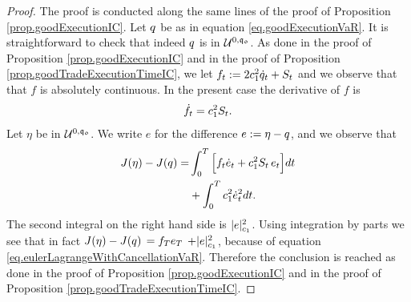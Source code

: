 \documentclass[10pt,a4paper]{article}
\begin{document}
\begin{proof}
	The proof is conducted along the same lines of the proof of Proposition \ref{prop.goodExecutionIC}.
	Let $q$ be as in equation \eqref{eq.goodExecutionVaR}. It is straightforward to check that indeed $q$ is in $\mathcal{U}^{0,\mathfrak{q_0}}$. 
	As done in the proof of Proposition \ref{prop.goodExecutionIC} and in the proof of Proposition \ref{prop.goodTradeExecutionTimeIC}, we let 
	 $f_t:= 2c_{1}^{2} \dot{q}_{t} + S_t$ and we observe that   that $f$ is absolutely continuous. In the present case the derivative of $f$ is  
	\begin{equation}\label{eq.eulerLagrangeWithCancellationVaR}
	\dot{f}_t =c_{1}^{2} S_t .
	\end{equation}
	Let $\eta$ be in $\mathcal{U}^{0,\mathfrak{q_0}}$. We write $e$ for the difference $e:=\eta-q$, and we observe that
	\begin{equation*}
	\begin{split}
	J(\eta) - J(q) = &
	\int_{0}^{T} \Big[ f_t \dot{e}_t + c_{1}^{2}S_t \, e_t\Big]dt\\
	&+\int_{0}^{T}c_{1}^{2} \dot{e}_t^{2} dt.
	\end{split}
	\end{equation*}
	The second integral on the right hand side is $ \lvert e \rvert_{c_{1}}^{2}$.  
	Using integration by parts we see that in fact $J(\eta) - J(q) $ $= f_T e_T $ $ + \lvert e \rvert_{c_{1}}^{2}$, because of equation \eqref{eq.eulerLagrangeWithCancellationVaR}.  Therefore the conclusion is reached as done in the proof of Proposition  \ref{prop.goodExecutionIC} and in the proof of Proposition \ref{prop.goodTradeExecutionTimeIC}.
\end{proof}
\end{document}
